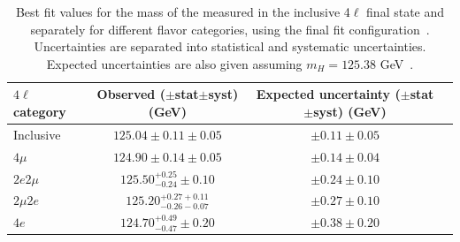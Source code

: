 
\begin{table}[!hbt]	
  \centering
    \small
    \begin{tabular}{lccc}
      $4\ell$ category & Observed ($\pm$stat$\pm$syst) (GeV) & Expected uncertainty ($\pm$stat$\pm$syst) (GeV)  \\
      \hline
      Inclusive  & $125.04\pm0.11 \pm 0.05$	&	 $\pm 0.11\pm  0.05$ \\
      $4\mu$ & $124.90 \pm 0.14 \pm 0.05$	&	$\pm 0.14\pm  0.04$ \\
      $2e2\mu$ &        $125.50^{+0.25}_{-0.24}\pm0.10$      &       $\pm0.24\pm0.10$ \\
      $2\mu2e$ &        $125.20^{+0.27+0.11}_{-0.26-0.07}$     &        $\pm0.27\pm0.10$ \\
      $4e$ &	$124.70^{+0.49}_{-0.47}\pm0.20$     &	$\pm0.38\pm0.20$ \\ 
  \end{tabular}
  \caption{Best fit values for the mass of the \Hboson measured in the inclusive 4$\ell$ final state and separately for different flavor categories, using the final fit configuration~\cite{PhysRevD.111.092014}. Uncertainties are separated into statistical and systematic uncertainties. Expected uncertainties are also given assuming $m_{H} = 125.38$ GeV~\cite{Sirunyan:2020xwk}.}
  \label{table:Mass_results}
\end{table}

